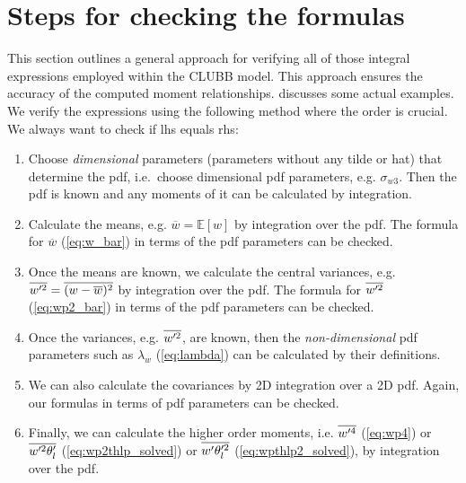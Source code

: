 \section{Steps for checking the formulas}\label{sec:steps-for-checking-the-formulas}

This section outlines a general approach for verifying all of those integral expressions
employed within the \gls{CLUBB} model.
This approach ensures the accuracy of the computed moment relationships.
 discusses some actual examples.
We verify the expressions using the following method where the order is crucial.
We always want to check if \gls{lhs} equals \gls{rhs}:

\begin{enumerate}
    \item\label{itm:checkingstep_1}
    Choose \emph{dimensional} parameters (parameters without any tilde or hat) that determine the \gls{pdf},
    i.e.\ choose dimensional \gls{pdf} parameters, e.g. $\sigma_{w 3}$.
    Then the \gls{pdf} is known and any moments of it can be calculated by integration.

    \item\label{itm:checkingstep_2}
    Calculate the means, e.g. $\overline{w} = \mathbb{E}[w]$ by integration over the \gls{pdf}.
    The formula for $\overline{w}$ (\cref{eq:w_bar}) in terms of the \gls{pdf} parameters can be checked.

    \item\label{itm:checkingstep_3}
    Once the means are known, we calculate the central variances,
    e.g.  $\overline{w'^2} = \overline{(w-\overline{w})^2}$ by integration over the \gls{pdf}.
    The formula for $\overline{w'^2}$ (\cref{eq:wp2_bar}) in terms of the \gls{pdf} parameters can be checked.

    \item\label{itm:checkingstep_4}
    Once the variances, e.g. $\overline{w'^2}$, are known,
    then the \emph{non-dimensional} \gls{pdf} parameters such as $\lambda_w$ (\cref{eq:lambda})
    can be calculated by their definitions.

    \item\label{itm:checkingstep_5}
    We can also calculate the covariances by 2D integration over a 2D \gls{pdf}.
    Again, our formulas in terms of \gls{pdf} parameters can be checked.

    \item\label{itm:checkingstep_6}
    Finally, we can calculate the higher order moments,
    i.e. $\overline{w'^4}$ (\cref{eq:wp4}) or $\overline{w'^2 \theta_l'}$ (\cref{eq:wp2thlp_solved})
    or $\overline{w' \theta_l'^2}$ (\cref{eq:wpthlp2_solved}),
    by integration over the \gls{pdf}.


\end{enumerate}
